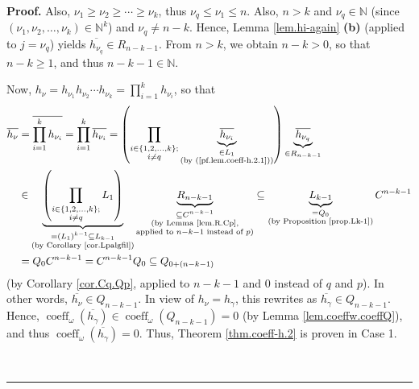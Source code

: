 \documentclass[numbers=enddot,12pt,final,onecolumn,notitlepage]{scrartcl}%
\theoremstyle{definition}
\newenvironment{proof}[1][Proof]{\noindent\textbf{#1.} }{\ \rule{0.5em}{0.5em}}
\let\prodnonlimits\prod
\renewcommand{\prod}{\prodnonlimits\limits}
\begin{document}
\begin{proof}
Also, $\nu_{1}\geq\nu_{2}\geq\cdots\geq\nu_{k}$, thus $\nu_{q}\leq\nu_{1}\leq
n$. Also, $n>k$ and $\nu_{q}\in\mathbb{N}$ (since $\left(  \nu_{1},\nu
_{2},\ldots,\nu_{k}\right)  \in\mathbb{N}^{k}$) and $\nu_{q}\neq n-k$. Hence,
Lemma \ref{lem.hi-again} \textbf{(b)} (applied to $j=\nu_{q}$) yields
$\overline{h_{\nu_{q}}}\in R_{n-k-1}$. From $n>k$, we obtain $n-k>0$, so that
$n-k\geq1$, and thus $n-k-1\in\mathbb{N}$.

Now, $h_{\nu}=h_{\nu_{1}}h_{\nu_{2}}\cdots h_{\nu_{k}}=\prod_{i=1}^{k}%
h_{\nu_{i}}$, so that%
\begin{align*}
\overline{h_{\nu}}  &  =\overline{\prod_{i=1}^{k}h_{\nu_{i}}}=\prod_{i=1}%
^{k}\overline{h_{\nu_{i}}}=\left(  \prod_{\substack{i\in\left\{
1,2,\ldots,k\right\}  ;\\i\neq q}}\underbrace{\overline{h_{\nu_{i}}}%
}_{\substack{\in L_{1}\\\text{(by (\ref{pf.lem.coeff-h.2.1}))}}}\right)
\underbrace{\overline{h_{\nu_{q}}}}_{\in R_{n-k-1}}\\
&  \in\underbrace{\left(  \prod_{\substack{i\in\left\{  1,2,\ldots,k\right\}
;\\i\neq q}}L_{1}\right)  }_{\substack{=\left(  L_{1}\right)  ^{k-1}\subseteq
L_{k-1}\\\text{(by Corollary \ref{cor.Lpalgfil})}}}\underbrace{R_{n-k-1}%
}_{\substack{\subseteq C^{n-k-1}\\\text{(by Lemma \ref{lem.R.Cp}%
,}\\\text{applied to }n-k-1\text{ instead of }p\text{)}}}\subseteq
\underbrace{L_{k-1}}_{\substack{=Q_{0}\\\text{(by Proposition \ref{prop.Lk-1}%
)}}}C^{n-k-1}\\
&  =Q_{0}C^{n-k-1}=C^{n-k-1}Q_{0}\subseteq Q_{0+\left(  n-k-1\right)  }%
\end{align*}
(by Corollary \ref{cor.Cq.Qp}, applied to $n-k-1$ and $0$ instead of $q$ and
$p$). In other words, $\overline{h_{\nu}}\in Q_{n-k-1}$. In view of $h_{\nu
}=h_{\gamma}$, this rewrites as $\overline{h_{\gamma}}\in Q_{n-k-1}$. Hence,
$\operatorname*{coeff}\nolimits_{\omega}\left(  \overline{h_{\gamma}}\right)
\in\operatorname*{coeff}\nolimits_{\omega}\left(  Q_{n-k-1}\right)  =0$ (by
Lemma \ref{lem.coeffw.coeffQ}), and thus $\operatorname*{coeff}%
\nolimits_{\omega}\left(  \overline{h_{\gamma}}\right)  =0$. Thus, Theorem
\ref{thm.coeff-h.2} is proven in Case 1.


\end{proof}
\end{document}
